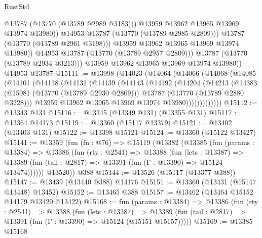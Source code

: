 \begin{lexlean}{RustStd}
\begin{coremodule}
                          @13787
                          (@13770 (@13789 @2989 @3183)))
                        @13959
                        @13962
                        @13965
                        @13969
                        @13974
                        @13980))
                    @14953
                    @13787
                    (@13770 (@13789 @2985 @2809)))
                  @13787
                  (@13770 (@13789 @2961 @3198)))
                @13959
                @13962
                @13965
                @13969
                @13974
                @13980))
            @14953
            @13787
            (@13770 (@13789 @2957 @2809)))
          @13787
          (@13770 (@13789 @2934 @3213)))
        @13959
        @13962
        @13965
        @13969
        @13974
        @13980))
    @14953
    @13787
@15111 := @13998
    (@14023
      (@14064
        (@14066
          (@14068
            (@14085
              (@14101
                (@14118
                  (@14131
                    (@14139
                      (@14143
                        (@14192
                          (@14204
                            (@14213
                              (@14383
                                (@15081 (@13770 (@13789 @2930 @2809)))
                                @13787
                                (@13770 (@13789 @2880 @3228)))
                              @13959
                              @13962
                              @13965
                              @13969
                              @13974
                              @13980)))))))))))))
@15112 := @13343 @131
@15116 := @13345 (@13349 @131) (@13355 @131)
@15117 := @13364 @14173
@15119 := @13360 (@15117 @13379)
@15121 := @13402 (@13403 @131)
@15122 := @13398 @15121
@15124 := @13360 (@15122 @13427)
@15141 := @13359
    (fun (fn : @76) =>
    @15119
      (@13382
        (@13385
          (fun (params : @13384) =>
          @13386
            (fun (rty : @2541) =>
            @13388
              (fun (lets : @13387) =>
              @13389 (fun (tail : @2817) => @13391 (fun (Γ : @13390) => @15124 @13474))))))
        @13520))
    @388
@15144 := @13526 (@15117 (@13377 @388))
@15147 := @13439 (@13440 @388) @14176
@15151 := @13360 (@13431 (@15147 @13448) @13452)
@15152 := @13465 @388
@15157 := @13462 (@13464 @15152 @14179 @13420 @13422)
@15168 := fun (params : @13384) =>
  @13386
    (fun (rty : @2541) =>
    @13388
      (fun (lets : @13387) =>
      @13389 (fun (tail : @2817) => @13391 (fun (Γ : @13390) => @15124 (@15151 @15157)))))
@15169 := @13385 @15168

\end{coremodule}
\end{lexlean}
